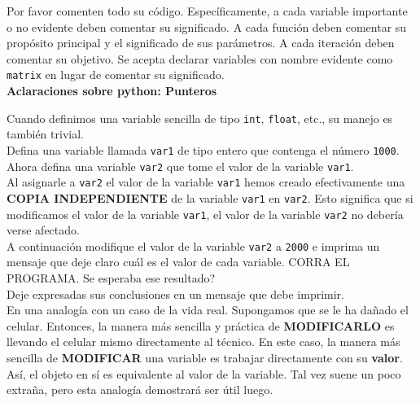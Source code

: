 \documentclass[11pt,letterpaper]{exam}
\begin{document}
\begin{questions}


Por favor comenten todo su c\'odigo. Espec\'ificamente, a cada variable importante o no evidente deben comentar su significado. A cada funci\'on deben comentar su prop\'osito principal y el significado de sus par\'ametros. A cada iteraci\'on deben comentar su objetivo. Se acepta declarar variables con nombre evidente como \verb"matrix" en lugar de comentar su significado.\\



\LARGE \textbf{Aclaraciones sobre python: Punteros}\\
\normalsize


Cuando definimos una variable sencilla de tipo \verb"int", \verb"float", etc., su manejo es tambi\'en trivial.\\

Defina una variable llamada \verb"var1" de tipo entero que contenga el n\'umero \verb"1000". Ahora defina una variable \verb"var2" que tome el valor de la variable \verb"var1".\\

Al asignarle a \verb"var2" el valor de la variable \verb"var1" hemos creado efectivamente una \textbf{COPIA INDEPENDIENTE} de la variable \verb"var1" en \verb"var2". Esto significa que si modificamos el valor de la variable \verb"var1", el valor de la variable \verb"var2" no deber\'ia verse afectado.\\

A continuaci\'on modifique el valor de la variable \verb"var2" a \verb"2000" e imprima un mensaje que deje claro cu\'al es el valor de cada variable. CORRA EL PROGRAMA. Se esperaba ese resultado?\\

Deje expresadas sus conclusiones en un mensaje que debe imprimir.\\

En una analog\'ia con un caso de la vida real. Supongamos que se le ha da\~nado el celular. Entonces, la manera m\'as sencilla y pr\'actica de \textbf{MODIFICARLO} es llevando el celular mismo directamente al t\'ecnico. En este caso, la manera m\'as sencilla de \textbf{MODIFICAR} una variable es trabajar directamente con su \textbf{valor}. As\'i, el objeto en s\'i es equivalente al valor de la variable. Tal vez suene un poco extra\~na, pero esta analog\'ia demostrar\'a ser \'util luego.\\  


\end{questions}
\end{document}
